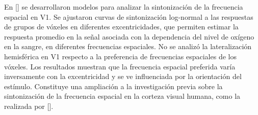 En [\cite{broderick_mapping_2022}] se desarrollaron modelos para analizar la sintonización de la frecuencia espacial en V1. Se ajustaron curvas de sintonización log-normal a las respuestas de grupos de vóxeles en diferentes excentricidades, que permiten estimar la respuesta promedio en la señal asociada con la dependencia del nivel de oxígeno en la sangre, en diferentes frecuencias espaciales. No se analiz\'o la lateralizaci\'on hemisf\'erica en V1 respecto a la preferencia de frecuencias espaciales de los v\'oxeles. Los resultados muestran que la frecuencia espacial preferida varía inversamente con la excentricidad y se ve influenciada por la orientación del estímulo. Constituye una ampliación a la investigación previa sobre la sintonización de la frecuencia espacial en la corteza visual humana, como la realizada por [\cite{aghajari_population_2020}].






